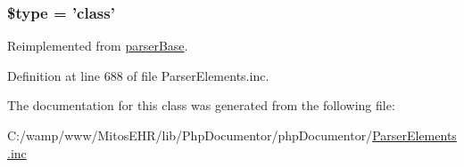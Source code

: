 \hypertarget{classparser_class_a9a4a6fba2208984cabb3afacadf33919}{
\subsubsection[{\$type}]{\setlength{\rightskip}{0pt plus 5cm}\$type = 'class'}}\label{classparser_class_a9a4a6fba2208984cabb3afacadf33919}


\-Reimplemented from \hyperlink{classparser_base_a9a4a6fba2208984cabb3afacadf33919}{parser\-Base}.



\-Definition at line 688 of file \-Parser\-Elements.\-inc.



\-The documentation for this class was generated from the following file\-:\begin{DoxyCompactItemize}
\item 
\-C\-:/wamp/www/\-Mitos\-E\-H\-R/lib/\-Php\-Documentor/php\-Documentor/\hyperlink{_parser_elements_8inc}{\-Parser\-Elements.\-inc}\end{DoxyCompactItemize}
